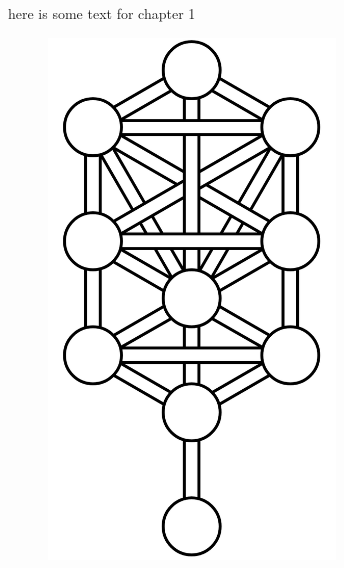 here is some text for chapter 1

\begin{figure}
    \centering
    \includegraphics[width=3in]{imageserver/uploadimages/image1.png}
\end{figure}
    
